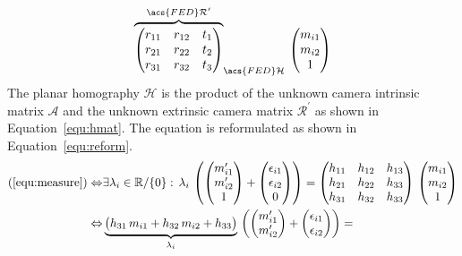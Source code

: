 \documentclass[12pt,a4paper,oneside,openright]{book}
\newcommand{\equ}[1]{Equation~\ref{equ:#1}}
\begin{document}
\begin{CJK}{UTF8}{}
\begin{align}
{   \overbrace{\begin{pmatrix}r_{11}&r_{12}&t_1\\r_{21}&r_{22}&t_2\\r_{31}&r_{32}&t_3\end{pmatrix}}^{\acs{FED}\mathcal{R}^\prime}}_{\acs{FED}\mathcal{H}}\,
   \begin{pmatrix}m_{i1}\\m_{i2}\\1\end{pmatrix}\label{equ:hmat}
\end{align}
The planar homography $\mathcal{H}$ is the product of the unknown camera intrinsic matrix $\mathcal{A}$ and the unknown extrinsic camera matrix $\mathcal{R}^\prime$ as shown in \equ{hmat}. The equation is reformulated as shown in \equ{reform}.
\begin{equation}\label{equ:reform}
  \begin{split}
    (\ref{equ:measure})\Leftrightarrow&\exists\lambda_i\in\mathbb{R}/\{0\}:\,\lambda_i\,\begin{pmatrix}\begin{pmatrix}m^\prime_{i1}\\m^\prime_{i2}\\1\end{pmatrix}+
    \begin{pmatrix}\epsilon_{i1}\\\epsilon_{i2}\\0\end{pmatrix}\end{pmatrix}=
    \begin{pmatrix}h_{11}&h_{12}&h_{13}\\h_{21}&h_{22}&h_{33}\\h_{31}&h_{32}&h_{33}\end{pmatrix}\,
    \begin{pmatrix}m_{i1}\\m_{i2}\\1\end{pmatrix}\\
    \Leftrightarrow&\underbrace{\big(h_{31}\,m_{i1}+h_{32}\,m_{i2}+h_{33}\big)}_{\lambda_i}\,\begin{pmatrix}\begin{pmatrix}m^\prime_{i1}\\m^\prime_{i2}\end{pmatrix}+
    \begin{pmatrix}\epsilon_{i1}\\\epsilon_{i2}\end{pmatrix}\end{pmatrix}=

\end{split}
\end{equation}
\end{CJK}
\end{document}
